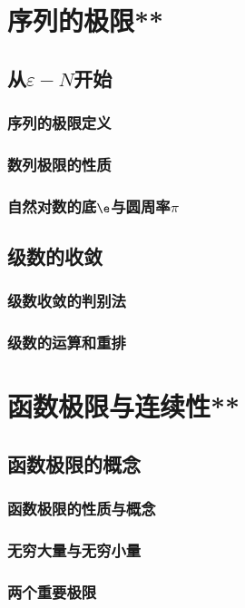 \chapter{序列的极限**}
\section{从\texorpdfstring{\(\varepsilon-N\)}s开始}
\subsection{序列的极限定义}
\clearpage
\subsection{数列极限的性质}
\clearpage
\subsection{自然对数的底\texorpdfstring{$\e$}e与圆周率\texorpdfstring{$\pi$}e}
\clearpage

\section{级数的收敛}
\subsection{级数收敛的判别法}
\clearpage
\subsection{级数的运算和重排}
\clearpage

\chapter{函数极限与连续性**}
\section{函数极限的概念}
\subsection{函数极限的性质与概念}
\clearpage
\subsection{无穷大量与无穷小量}
\clearpage
\subsection{两个重要极限}
\clearpage
